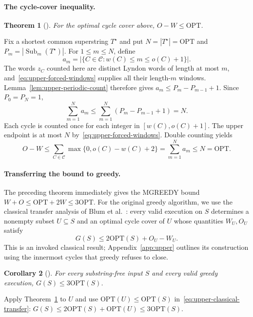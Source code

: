 \documentclass[11pt,a4paper]{article}   %
\makeatletter
\renewenvironment{proof}[1][\proofname]{\par
  \pushQED{\qed}%
  \normalfont \topsep1\p@\@plus1\p@\relax
  \trivlist
  \item[\hskip\labelsep\itshape #1\@addpunct{.}]\ignorespaces
}{\popQED\endtrivlist\@endpefalse}
\theoremstyle{compact}
\newtheorem{theorem}{Theorem}[section]
\newtheorem{corollary}[theorem]{Corollary}
\theoremstyle{compactdef}
\newcommand{\OPT}{\mathrm{OPT}}
\newcommand{\GR}{G}                         %
\makeatother
\begin{document}
\paragraph{The cycle-cover inequality.}

\begin{theorem}[\cite{CKMS26}]\label{thm:upper-cycle-inequality}
For the optimal cycle cover above, $O-W\le\OPT$.
\end{theorem}

\begin{proof}
Fix a shortest common superstring $T^\star$ and put
$N=|T^\star|=\OPT$ and $P_m=|\operatorname{Sub}_m(T^\star)|$.
For $1\le m\le N$, define
\[
  a_m=\bigl|\{C\in\mathcal C:w(C)\le m\le o(C)+1\}\bigr|.
\]
The words $z_C$ counted here are distinct Lyndon words of length at most
$m$, and~\eqref{eq:upper-forced-windows} supplies all their length-$m$
windows. Lemma~\ref{lem:upper-periodic-count} therefore gives
$a_m\le P_m-P_{m-1}+1$. Since $P_0=P_N=1$,
\[
  \sum_{m=1}^{N}a_m
  \le \sum_{m=1}^{N}(P_m-P_{m-1}+1)=N.
\]
Each cycle is counted once for each integer in $[w(C),o(C)+1]$.
The upper endpoint is at most $N$ by~\eqref{eq:upper-forced-windows}.
Double counting yields
\[
  O-W
  \le \sum_{C\in\mathcal C}\max\{0,o(C)-w(C)+2\}
  =\sum_{m=1}^{N}a_m
  \le N=\OPT.
\]
\end{proof}

\paragraph{Transferring the bound to greedy.}
The preceding theorem immediately gives the MGREEDY bound
$W+O\le\OPT+2W\le3\OPT$.
For the original greedy algorithm, we use the classical transfer analysis
of Blum et al.~\cite[Section 5]{BJLTY94}: every valid execution on $S$
determines a nonempty subset $U\subseteq S$ and an optimal cycle cover
of $U$ whose quantities $W_U,O_U$ satisfy
\begin{equation}\label{eq:upper-classical-transfer}
  \GR(S)\le 2\OPT(S)+O_U-W_U.
\end{equation}
This is an invoked classical result; Appendix~\ref{app:upper} outlines
its construction using the innermost cycles that greedy refuses to close.

\begin{corollary}[\cite{CKMS26}]
For every substring-free input $S$ and every valid greedy execution,
$\GR(S)\le3\OPT(S)$.
\end{corollary}
\begin{proof}
Apply Theorem~\ref{thm:upper-cycle-inequality} to $U$ and use
$\OPT(U)\le\OPT(S)$ in~\eqref{eq:upper-classical-transfer}:
$\GR(S)\le2\OPT(S)+\OPT(U)\le3\OPT(S)$.
\end{proof}
\end{document}
